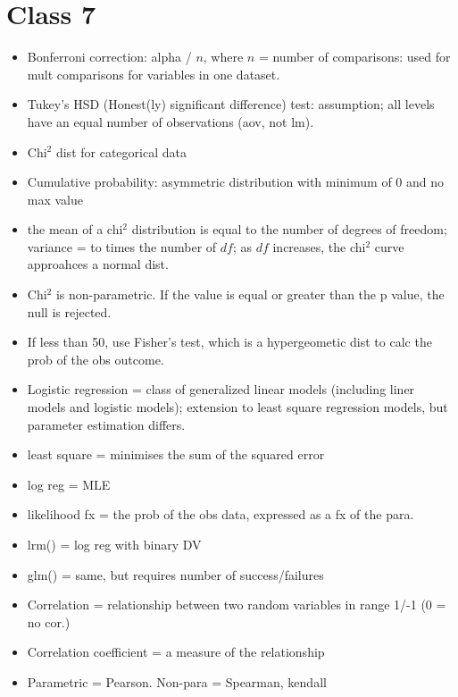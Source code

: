 \documentclass[11pt]{article}
\newenvironment{itemise}{
\begin{itemize}
  \setlength{\itemsep}{1pt}
  \setlength{\parskip}{0pt}
  \setlength{\parsep}{0pt}
}{\end{itemize}}
\begin{document}
\section*{Class 7}
\begin{itemise}
\item Bonferroni correction: alpha / $n$, where $n$ = number of comparisons: used for mult comparisons for variables in one dataset. 
\item Tukey's HSD (Honest(ly) significant difference) test: assumption; all levels have an equal number of observations (aov, not lm).
\item Chi$^2$ dist for categorical data
\item Cumulative probability: asymmetric distribution with minimum of 0 and no max value
\item the mean of a chi$^2$ distribution is equal to the number of degrees of freedom; variance = to times the number of $df$; as $df$ increases, the chi$^2$ curve approahces a normal dist.
\item Chi$^2$ is non-parametric. If the value is equal or greater than the p value, the null is rejected.
\item If less than 50, use Fisher's test, which is a hypergeometic dist to calc the prob of the obs outcome. 
\item Logistic regression = class of generalized linear models (including liner models and logistic models); extension to least square regression models, but parameter estimation differs.
\item least square = minimises the sum of the squared error
\item log reg = MLE
\item likelihood fx = the prob of the obs data, expressed as a fx of the para. 
\item lrm() = log reg with binary DV
\item glm() = same, but requires number of success/failures
\item Correlation = relationship between two random variables in range 1/-1 (0 = no cor.)
\item Correlation coefficient = a measure of the relationship
\item Parametric = Pearson. Non-para = Spearman, kendall
\end{itemise}

















%
%
\end{document}
